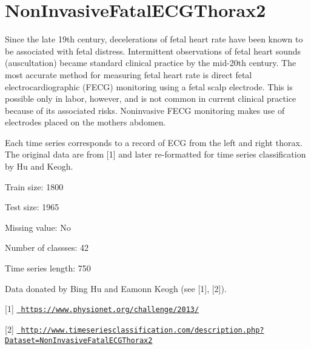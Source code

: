 \chapter{Non\+Invasive\+Fatal\+ECGThorax2}
\hypertarget{md_external_2data_2UCRArchive__2018_2NonInvasiveFetalECGThorax2_2README}{}\label{md_external_2data_2UCRArchive__2018_2NonInvasiveFetalECGThorax2_2README}
\label{md_external_2data_2UCRArchive__2018_2NonInvasiveFetalECGThorax2_2README_autotoc_md157}%
%
 Since the late 19th century, decelerations of fetal heart rate have been known to be associated with fetal distress. Intermittent observations of fetal heart sounds (auscultation) became standard clinical practice by the mid-\/20th century. The most accurate method for measuring fetal heart rate is direct fetal electrocardiographic (FECG) monitoring using a fetal scalp electrode. This is possible only in labor, however, and is not common in current clinical practice because of its associated risks. Noninvasive FECG monitoring makes use of electrodes placed on the mother\textquotesingle{}s abdomen.

Each time series corresponds to a record of ECG from the left and right thorax. The original data are from \mbox{[}1\mbox{]} and later re-\/formatted for time series classification by Hu and Keogh.

Train size\+: 1800

Test size\+: 1965

Missing value\+: No

Number of classses\+: 42

Time series length\+: 750

Data donated by Bing Hu and Eamonn Keogh (see \mbox{[}1\mbox{]}, \mbox{[}2\mbox{]}).

\mbox{[}1\mbox{]} \href{https://www.physionet.org/challenge/2013/}{\texttt{ https\+://www.\+physionet.\+org/challenge/2013/}}

\mbox{[}2\mbox{]} \href{http://www.timeseriesclassification.com/description.php?Dataset=NonInvasiveFatalECGThorax2}{\texttt{ http\+://www.\+timeseriesclassification.\+com/description.\+php?\+Dataset=\+Non\+Invasive\+Fatal\+ECGThorax2}} 